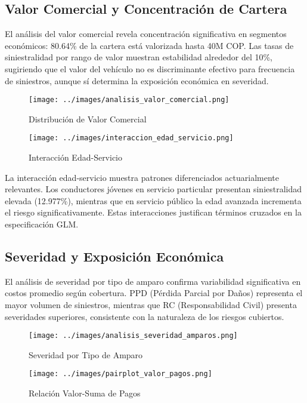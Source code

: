 \subsection{Valor Comercial y Concentración de Cartera}

El análisis del valor comercial revela concentración significativa en segmentos económicos: 80.64\% de la cartera está valorizada hasta 40M COP. Las tasas de siniestralidad por rango de valor muestran estabilidad alrededor del 10\%, sugiriendo que el valor del vehículo no es discriminante efectivo para frecuencia de siniestros, aunque sí determina la exposición económica en severidad.

\begin{figure}[H]
\centering
\begin{minipage}{0.48\textwidth}
\centering
\texttt{[image: ../images/analisis\_valor\_comercial.png]}
\caption{Distribución de Valor Comercial}
\end{minipage}
\hfill
\begin{minipage}{0.48\textwidth}
\centering
\texttt{[image: ../images/interaccion\_edad\_servicio.png]}
\caption{Interacción Edad-Servicio}
\end{minipage}
\end{figure}

La interacción edad-servicio muestra patrones diferenciados actuarialmente relevantes. Los conductores jóvenes en servicio particular presentan siniestralidad elevada (12.977\%), mientras que en servicio público la edad avanzada incrementa el riesgo significativamente. Estas interacciones justifican términos cruzados en la especificación GLM.

\subsection{Severidad y Exposición Económica}

El análisis de severidad por tipo de amparo confirma variabilidad significativa en costos promedio según cobertura. PPD (Pérdida Parcial por Daños) representa el mayor volumen de siniestros, mientras que RC (Responsabilidad Civil) presenta severidades superiores, consistente con la naturaleza de los riesgos cubiertos.

\begin{figure}[H]
\centering
\begin{minipage}{0.48\textwidth}
\centering
\texttt{[image: ../images/analisis\_severidad\_amparos.png]}
\caption{Severidad por Tipo de Amparo}
\end{minipage}
\hfill
\begin{minipage}{0.48\textwidth}
\centering
\texttt{[image: ../images/pairplot\_valor\_pagos.png]}
\caption{Relación Valor-Suma de Pagos}
\end{minipage}
\end{figure}

